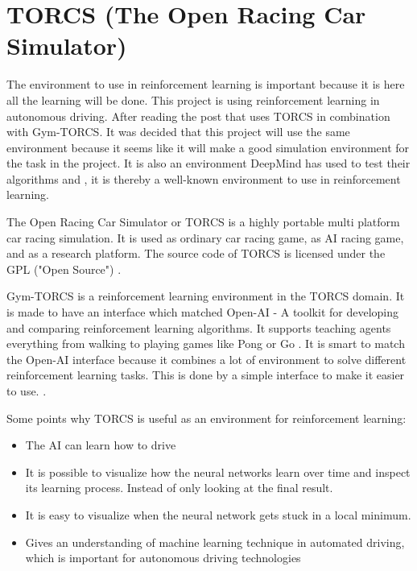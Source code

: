 \section{TORCS (The Open Racing Car Simulator)}
\label{sec:TORCS}
The environment to use in reinforcement learning is important because it is here all the learning will be done. This project is using reinforcement learning in autonomous driving. After reading the post \cite{DDPG_Torcs} that uses TORCS in combination with Gym-TORCS. It was decided that this project will use the same environment because it seems like it will make a good simulation environment for the task in the project. It is also an environment DeepMind has used to test their algorithms \cite{DBLP:journals/corr/LillicrapHPHETS15} and \cite{DBLP:journals/corr/MnihBMGLHSK16}, it is thereby a well-known environment to use in reinforcement learning. 

The Open Racing Car Simulator or TORCS is a highly portable multi platform car racing simulation. It is used as ordinary car racing game, as AI racing game, and as a research platform. The source code of TORCS is licensed under the GPL ("Open Source") \cite{TORCS_website}. 

Gym-TORCS is a reinforcement learning environment in the TORCS domain. It is made to have an interface which matched Open-AI - A toolkit for developing and comparing reinforcement learning algorithms. It supports teaching agents everything from walking to playing games like Pong or Go \cite{OPENAI_website}. It is smart to match the Open-AI interface because it combines a lot of environment to solve different reinforcement learning tasks. This is done by a simple interface to make it easier to use. \cite{Gym_TORCS_website}. 

Some points why TORCS is useful as an environment for reinforcement learning:
\begin{itemize}
	\item The AI can learn how to drive
	\item It is possible to visualize how the neural networks learn over time and inspect its learning process. Instead of only looking at the final result.
	\item It is easy to visualize when the neural network gets stuck in a local minimum.
	\item Gives an understanding of machine learning technique in automated driving, which is important for autonomous driving technologies 
\end{itemize}

